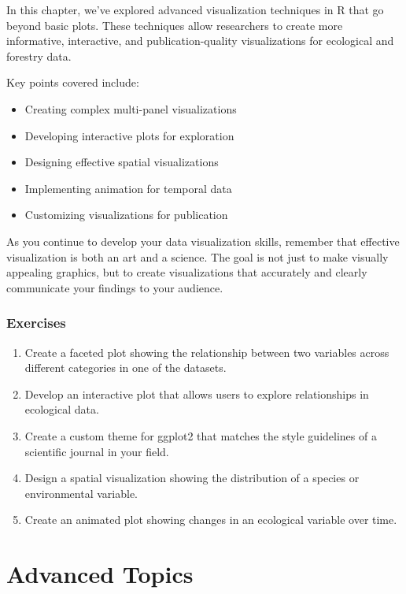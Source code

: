 \documentclass[
  letterpaper,
]{book}
\providecommand{\tightlist}{%
  \setlength{\itemsep}{0pt}\setlength{\parskip}{0pt}}
\begin{document}
In this chapter, we've explored advanced visualization techniques in R
that go beyond basic plots. These techniques allow researchers to create
more informative, interactive, and publication-quality visualizations
for ecological and forestry data.

Key points covered include:

\begin{itemize}
\tightlist
\item
  Creating complex multi-panel visualizations
\item
  Developing interactive plots for exploration
\item
  Designing effective spatial visualizations
\item
  Implementing animation for temporal data
\item
  Customizing visualizations for publication
\end{itemize}

As you continue to develop your data visualization skills, remember that
effective visualization is both an art and a science. The goal is not
just to make visually appealing graphics, but to create visualizations
that accurately and clearly communicate your findings to your audience.

\section{Exercises}\label{exercises-6}

\begin{enumerate}
\def\labelenumi{\arabic{enumi}.}
\tightlist
\item
  Create a faceted plot showing the relationship between two variables
  across different categories in one of the datasets.
\item
  Develop an interactive plot that allows users to explore relationships
  in ecological data.
\item
  Create a custom theme for ggplot2 that matches the style guidelines of
  a scientific journal in your field.
\item
  Design a spatial visualization showing the distribution of a species
  or environmental variable.
\item
  Create an animated plot showing changes in an ecological variable over
  time.
\end{enumerate}

\part{Advanced Topics}
\end{document}
